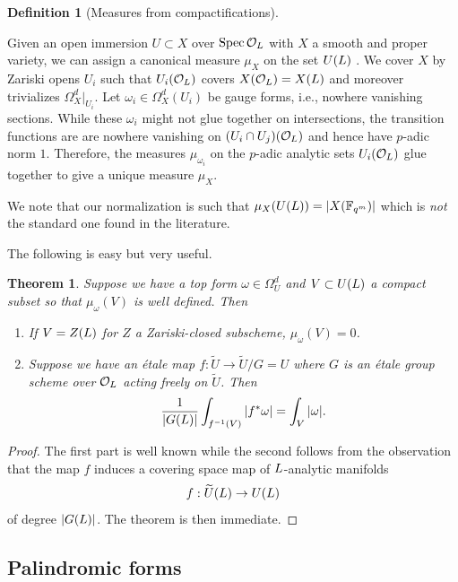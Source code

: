 \documentclass[10pt]{article}
\theoremstyle{plain}
\newtheorem{thm}[theorem]{Theorem}
\theoremstyle{definition}
\newtheorem{definition}[theorem]{Definition}
\numberwithin{equation}{section}
\begin{document}
\begin{definition}[Measures from compactifications]\label{defn: measures from scheme compactifications}

Given an open immersion $U \subset X$ over $\operatorname{Spec}{{\mathcal O}_{L}}$ with $X$ a smooth and proper variety, we can assign a canonical measure $\mu_X$ on the set $U({L})$ \cite[\S 4.1]{yasuda2017wild}. We cover $X$ by Zariski opens $U_i$ such that $U_i({{\mathcal O}_{L}})$ covers $X({{\mathcal O}_{L}}) = X({L})$ and moreover trivializes $\Omega_X^d|_{U_i}$. Let $\omega_i \in \Omega_X^d(U_i)$ be gauge forms, i.e., nowhere vanishing sections. While these $\omega_i$ might not glue together on intersections, the transition functions are are nowhere vanishing on $(U_i\cap U_j)({{\mathcal O}_{L}})$ and hence have $p$-adic norm $1$. Therefore, the measures $\mu_{\omega_i}$ on the $p$-adic analytic sets $U_i({{\mathcal O}_{L}})$ glue together to give a unique measure $\mu_X$.
\end{definition}

We note that our normalization is such that $\mu_X(U({L})) = |X(\mathbb F_{q^m})|$ which is \emph{not} the standard one found in the literature. 

The following is easy but very useful.

\begin{thm}\cite[Proposition 2.1]{groechenig2020geometric}\label{thm: change of variables}
Suppose we have a top form $\omega \in \Omega_U^d$ and $V \subset U({L})$ a compact subset so that $\mu_\omega(V)$ is well defined. Then
\begin{enumerate}
    \item If $V = Z({L})$ for $Z$ a Zariski-closed subscheme, $\mu_\omega(V) = 0$.
    \item Suppose we have an \'etale map $f: \widetilde U \to \widetilde U/G = U$ where $G$ is an \'etale group scheme over ${{\mathcal O}_{L}}$ acting freely on $\widetilde U$. Then
    \[\frac{1}{|G({L})|}\int_{f^{-1}(V)}|f^*\omega| = \int_{V}|\omega|.\]
\end{enumerate}
\end{thm}
\begin{proof}
The first part is well known while the second follows from the observation that the map $f$ induces a covering space map of ${L}$-analytic manifolds
\[f: \widetilde{U}({L}) \to U({L})\]
of degree $|G({L})|$. The theorem is then immediate.
\end{proof}
\subsection{Palindromic forms}
\end{document}
